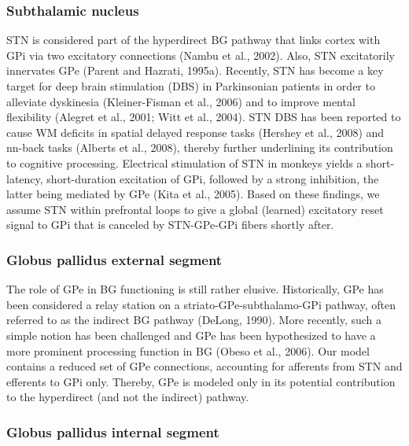 \documentclass[
  11pt,
  a4paper,
]{scrbook}
\begin{document}
\subsubsection*{Subthalamic nucleus}\label{subthalamic-nucleus}

STN is considered part of the hyperdirect BG pathway that links cortex
with GPi via two excitatory connections (Nambu et al., 2002). Also, STN
excitatorily innervates GPe (Parent and Hazrati, 1995a). Recently, STN
has become a key target for deep brain stimulation (DBS) in Parkinsonian
patients in order to alleviate dyskinesia (Kleiner-Fisman et al., 2006)
and to improve mental flexibility (Alegret et al., 2001; Witt et al.,
2004). STN DBS has been reported to cause WM deficits in spatial delayed
response tasks (Hershey et al., 2008) and nn-back tasks (Alberts et al.,
2008), thereby further underlining its contribution to cognitive
processing. Electrical stimulation of STN in monkeys yields a
short-latency, short-duration excitation of GPi, followed by a strong
inhibition, the latter being mediated by GPe (Kita et al., 2005). Based
on these findings, we assume STN within prefrontal loops to give a
global (learned) excitatory reset signal to GPi that is canceled by
STN-GPe-GPi fibers shortly after.

\subsubsection*{Globus pallidus external
segment}\label{globus-pallidus-external-segment}

The role of GPe in BG functioning is still rather elusive. Historically,
GPe has been considered a relay station on a striato-GPe-subthalamo-GPi
pathway, often referred to as the indirect BG pathway (DeLong, 1990).
More recently, such a simple notion has been challenged and GPe has been
hypothesized to have a more prominent processing function in BG (Obeso
et al., 2006). Our model contains a reduced set of GPe connections,
accounting for afferents from STN and efferents to GPi only. Thereby,
GPe is modeled only in its potential contribution to the hyperdirect
(and not the indirect) pathway.

\subsubsection*{Globus pallidus internal
segment}\label{globus-pallidus-internal-segment}
\end{document}
